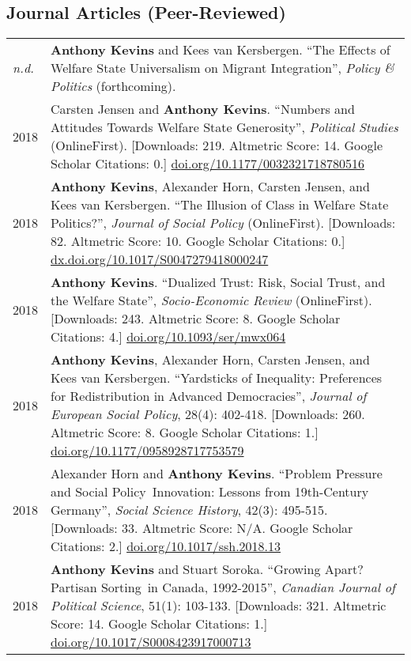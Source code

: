\documentclass[letterpaper,fontsize=10pt]{scrartcl}
\begin{document}
	\vspace{-.25em}
\subsection{Journal Articles (Peer-Reviewed)}
	\vspace{-1.5em}
	\begin{tabularx}{\textwidth}{@{} l X @{} }
    \textit{n.d.} &  \textbf{Anthony Kevins} and Kees van Kersbergen. ``The Effects of Welfare State Universalism on Migrant Integration'', \textit{Policy \& Politics} (forthcoming).\\[1ex]
    2018 & Carsten Jensen and \textbf{Anthony Kevins}. ``Numbers and Attitudes Towards Welfare State Generosity'', \textit{Political Studies} (OnlineFirst). [Downloads: 219. Altmetric Score: 14. Google Scholar Citations: 0.] \href{https://doi.org/10.1177/0032321718780516}{doi.org/10.1177/0032321718780516}\\[1ex]
    2018 & \textbf{Anthony Kevins}, Alexander Horn, Carsten Jensen, and Kees van Kersbergen. ``The Illusion of Class in Welfare State Politics?'', \textit{Journal of Social Policy} (OnlineFirst). [Downloads: 82. Altmetric Score: 10. Google Scholar Citations: 0.] \href{https://dx.doi.org/10.1017/S0047279418000247}{dx.doi.org/10.1017/S0047279418000247}\\[1ex]
    2018 & \textbf{Anthony Kevins}. ``Dualized Trust: Risk, Social Trust, and the Welfare State'', \textit{Socio-Economic Review} (OnlineFirst). [Downloads: 243. Altmetric Score: 8. Google Scholar Citations: 4.] \href{https://doi.org/10.1093/ser/mwx064}{doi.org/10.1093/ser/mwx064}\\[1ex]
    2018 & \textbf{Anthony Kevins}, Alexander Horn, Carsten Jensen, and Kees van Kersbergen. ``Yardsticks of Inequality: Preferences for Redistribution in Advanced Democracies'', \textit{Journal of European Social Policy}, 28(4): 402-418. [Downloads: 260. Altmetric Score: 8. Google Scholar Citations: 1.] \href{https://doi.org/10.1177/0958928717753579}{doi.org/10.1177/0958928717753579}\\[1ex]
		2018 & Alexander Horn and \textbf{Anthony Kevins}. ``Problem Pressure and Social Policy~Innovation: Lessons from 19th-Century Germany'', \textit{Social Science History}, 42(3): 495-515. [Downloads: 33. Altmetric Score: N/A. Google Scholar Citations: 2.] \href{https://doi.org/10.1017/ssh.2018.13}{doi.org/10.1017/ssh.2018.13}\\[1ex]
		2018 & \textbf{Anthony Kevins} and Stuart Soroka. ``Growing Apart? Partisan Sorting~in Canada, 1992-2015'', \textit{Canadian Journal of Political Science}, 51(1): 103-133. [Downloads: 321. Altmetric Score: 14. Google Scholar Citations: 1.] \href{https://doi.org/10.1017/S0008423917000713}{doi.org/10.1017/S0008423917000713}\\[1ex]

\end{tabularx}
\end{document}
